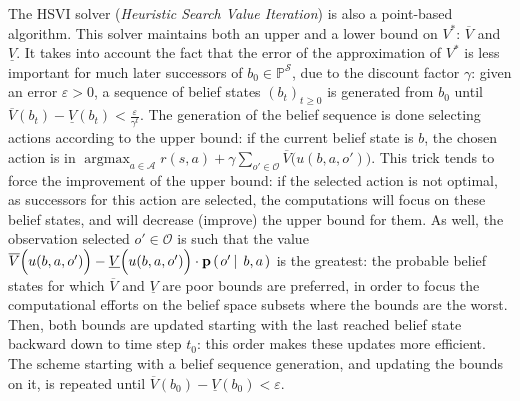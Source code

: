 The HSVI solver (\textit{Heuristic Search Value Iteration}) \cite{Smith:2004:HSV:1036843.1036906} is also a point-based algorithm.
This solver maintains both an upper and a lower bound on $V^*$: $\overline{V}$ and $\underline{V}$.
It takes into account the fact that the error of the approximation of $V^*$ 
is less important for much later successors of $b_0 \in \mathbb{P}^{\mathcal{S}}$,
due to the discount factor $\gamma$:
given an error $\varepsilon>0$, a sequence of belief states $(b_t)_{t\geqslant0}$ is generated
from $b_0$ until $\overline{V}(b_t) - \underline{V}(b_t) < \frac{\varepsilon}{\gamma^t}$. 
The generation of the belief sequence is done selecting actions 
according to the upper bound: if the current belief state is $b$, the chosen action is in
$\operatorname*{argmax}_{a \in \mathcal{A}} r(s,a) + \gamma \sum_{o' \in \mathcal{O}} \overline{V}\Big(u(b,a,o')\Big)$.
This trick tends to force the improvement of the upper bound: if the selected action is not optimal,
as successors for this action are selected, the computations will focus on
these belief states, and will decrease (improve) the upper bound for them.
As well, the observation selected $o' \in \mathcal{O}$ is such that 
the value $\overline{V}\Big(u(b,a,o')\Big) - \underline{V}\Big(u(b,a,o')\Big) \cdot \textbf{p} \left( \left.  o' \, \right| \left. \, b, a  \right. \right)$ is the greatest:
the probable belief states for which $\overline{V}$ and $\underline{V}$
are poor bounds are preferred, in order to focus the computational efforts
on the belief space subsets where the bounds are the worst. 
Then, both bounds are updated starting with the last reached belief state
backward down to time step $t_0$: this order makes these updates more efficient.
The scheme starting with a belief sequence generation, and updating the bounds on it,
is repeated until $\overline{V}(b_0) - \underline{V}(b_0) < \varepsilon$.

